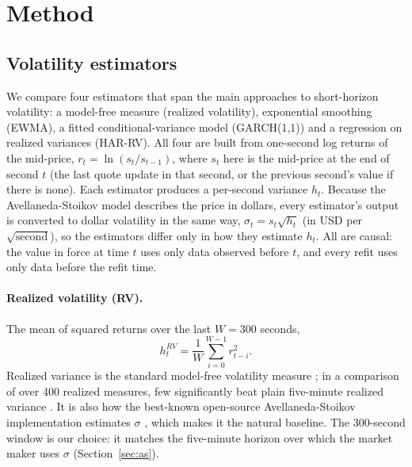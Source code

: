 \documentclass[11pt]{article}
\begin{document}
\section{Method}
\label{sec:method}

\subsection{Volatility estimators}
\label{sec:estimators}

We compare four estimators that span the main approaches to short-horizon volatility: a model-free
measure (realized volatility), exponential smoothing (EWMA), a fitted conditional-variance model
(GARCH(1,1)) and a regression on realized variances (HAR-RV). All four are built from one-second log
returns of the mid-price, $r_t = \ln(s_t / s_{t-1})$, where $s_t$ here is the mid-price at the end of
second $t$ (the last quote update in that second, or the previous second's value if there is none). Each
estimator produces a per-second variance $h_t$.
Because the Avellaneda-Stoikov model describes the price in dollars, every estimator's output is
converted to dollar volatility in the same way, $\sigma_t = s_t\sqrt{h_t}$ (in USD per
$\sqrt{\text{second}}$), so the estimators differ only in how they estimate $h_t$. All are causal: the
value in force at time $t$ uses only data observed before $t$, and every refit uses only data before the
refit time.

\paragraph{Realized volatility (RV).}
The mean of squared returns over the last $W = 300$ seconds,
\begin{equation}
  h_t^{RV} = \frac{1}{W}\sum_{i=0}^{W-1} r_{t-i}^2 .
  \label{eq:rv}
\end{equation}
Realized variance is the standard model-free volatility measure \citep{andersen1998}; in a comparison
of over 400 realized measures, few significantly beat plain five-minute realized variance
\citep{lps2015}. It is also how the best-known open-source
Avellaneda-Stoikov implementation estimates $\sigma$ \citep{hummingbot_instantvol}, which makes it the
natural baseline. The 300-second window is our choice: it matches the five-minute horizon over which
the market maker uses $\sigma$ (Section~\ref{sec:as}).
\end{document}
